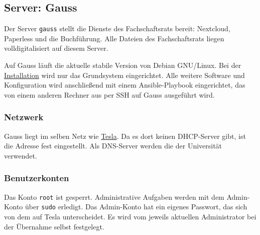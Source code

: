 \subsection{Server: Gauss}
\label{gauss}
Der Server \texttt{gauss} stellt die Dienste des Fachschaftsrats bereit: Nextcloud, Paperless und die Buchführung. Alle Dateien des Fachschaftsrats liegen volldigitalisiert auf diesem Server.

Auf Gauss läuft die aktuelle stabile Version von Debian GNU/Linux. Bei der \hyperref[grundsystem-installieren]{Installation} wird nur das Grundsystem eingerichtet. Alle weitere Software und Konfiguration wird anschließend mit einem Ansible-Playbook eingerichtet, das von einem anderen Rechner aus per SSH auf Gauss ausgeführt wird.

\subsubsection{Netzwerk}
\label{gauss-netzwerk}
Gauss liegt im selben Netz wie \hyperref[tesla-netzwerk]{Tesla}. Da es dort keinen DHCP-Server gibt, ist die Adresse fest eingestellt. Als DNS-Server werden die der Universität verwendet.

\begin{config}
\end{config}

\subsubsection{Benutzerkonten}
\label{gauss-benutzer}
Das Konto \texttt{root} ist gesperrt. Administrative Aufgaben werden mit dem Admin-Konto über \texttt{sudo} erledigt. Das Admin-Konto hat ein eigenes Passwort, das sich von dem auf Tesla unterscheidet. Es wird vom jeweils aktuellen Administrator bei der Übernahme selbst festgelegt.

\begin{config}
\end{config}

